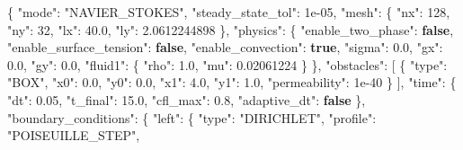 \documentclass[
  10pt,
]{article}
\newenvironment{Shaded}{}{}
\newcommand{\DataTypeTok}[1]{\textcolor[rgb]{0.56,0.13,0.00}{#1}}
\newcommand{\DecValTok}[1]{\textcolor[rgb]{0.25,0.63,0.44}{#1}}
\newcommand{\FloatTok}[1]{\textcolor[rgb]{0.25,0.63,0.44}{#1}}
\newcommand{\FunctionTok}[1]{\textcolor[rgb]{0.02,0.16,0.49}{#1}}
\newcommand{\KeywordTok}[1]{\textcolor[rgb]{0.00,0.44,0.13}{\textbf{#1}}}
\newcommand{\OtherTok}[1]{\textcolor[rgb]{0.00,0.44,0.13}{#1}}
\newcommand{\StringTok}[1]{\textcolor[rgb]{0.25,0.44,0.63}{#1}}
\begin{document}
\begin{Shaded}
\begin{Highlighting}[]
\FunctionTok{\{}
  \DataTypeTok{"mode"}\FunctionTok{:} \StringTok{"NAVIER\_STOKES"}\FunctionTok{,}
  \DataTypeTok{"steady\_state\_tol"}\FunctionTok{:} \DecValTok{1e{-}05}\FunctionTok{,}
  \DataTypeTok{"mesh"}\FunctionTok{:} \FunctionTok{\{}
    \DataTypeTok{"nx"}\FunctionTok{:} \DecValTok{128}\FunctionTok{,}
    \DataTypeTok{"ny"}\FunctionTok{:} \DecValTok{32}\FunctionTok{,}
    \DataTypeTok{"lx"}\FunctionTok{:} \FloatTok{40.0}\FunctionTok{,}
    \DataTypeTok{"ly"}\FunctionTok{:} \FloatTok{2.0612244898}
  \FunctionTok{\},}
  \DataTypeTok{"physics"}\FunctionTok{:} \FunctionTok{\{}
    \DataTypeTok{"enable\_two\_phase"}\FunctionTok{:} \KeywordTok{false}\FunctionTok{,}
    \DataTypeTok{"enable\_surface\_tension"}\FunctionTok{:} \KeywordTok{false}\FunctionTok{,}
    \DataTypeTok{"enable\_convection"}\FunctionTok{:} \KeywordTok{true}\FunctionTok{,}
    \DataTypeTok{"sigma"}\FunctionTok{:} \FloatTok{0.0}\FunctionTok{,}
    \DataTypeTok{"gx"}\FunctionTok{:} \FloatTok{0.0}\FunctionTok{,}
    \DataTypeTok{"gy"}\FunctionTok{:} \FloatTok{0.0}\FunctionTok{,}
    \DataTypeTok{"fluid1"}\FunctionTok{:} \FunctionTok{\{}
      \DataTypeTok{"rho"}\FunctionTok{:} \FloatTok{1.0}\FunctionTok{,}
      \DataTypeTok{"mu"}\FunctionTok{:} \FloatTok{0.02061224}
    \FunctionTok{\}}
  \FunctionTok{\},}
  \DataTypeTok{"obstacles"}\FunctionTok{:} \OtherTok{[}
    \FunctionTok{\{}
      \DataTypeTok{"type"}\FunctionTok{:} \StringTok{"BOX"}\FunctionTok{,}
      \DataTypeTok{"x0"}\FunctionTok{:} \FloatTok{0.0}\FunctionTok{,}
      \DataTypeTok{"y0"}\FunctionTok{:} \FloatTok{0.0}\FunctionTok{,}
      \DataTypeTok{"x1"}\FunctionTok{:} \FloatTok{4.0}\FunctionTok{,}
      \DataTypeTok{"y1"}\FunctionTok{:} \FloatTok{1.0}\FunctionTok{,}
      \DataTypeTok{"permeability"}\FunctionTok{:} \DecValTok{1e{-}40}
    \FunctionTok{\}}
  \OtherTok{]}\FunctionTok{,}
  \DataTypeTok{"time"}\FunctionTok{:} \FunctionTok{\{}
    \DataTypeTok{"dt"}\FunctionTok{:} \FloatTok{0.05}\FunctionTok{,}
    \DataTypeTok{"t\_final"}\FunctionTok{:} \FloatTok{15.0}\FunctionTok{,}
    \DataTypeTok{"cfl\_max"}\FunctionTok{:} \FloatTok{0.8}\FunctionTok{,}
    \DataTypeTok{"adaptive\_dt"}\FunctionTok{:} \KeywordTok{false}
  \FunctionTok{\},}
  \DataTypeTok{"boundary\_conditions"}\FunctionTok{:} \FunctionTok{\{}
    \DataTypeTok{"left"}\FunctionTok{:} \FunctionTok{\{}
      \DataTypeTok{"type"}\FunctionTok{:} \StringTok{"DIRICHLET"}\FunctionTok{,}
      \DataTypeTok{"profile"}\FunctionTok{:} \StringTok{"POISEUILLE\_STEP"}\FunctionTok{,}

\end{Highlighting}
\end{Shaded}
\end{document}
